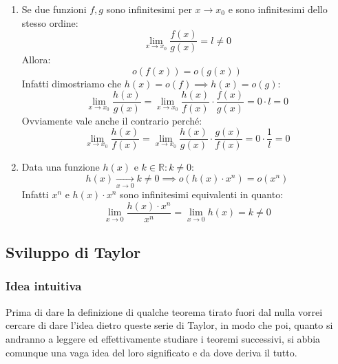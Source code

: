 \begin{enumerate}
	\item Se due funzioni $f,g$ sono infinitesimi per $x \to x_0$ e sono infinitesimi dello stesso ordine:
		\begin{equation*}
			\lim_{x \to x_0} \dfrac{f(x)}{g(x)} = l \neq 0
		\end{equation*}
		Allora:
		\begin{equation*}
			o(f(x)) = o(g(x))
		\end{equation*}
		Infatti dimostriamo che $h(x) = o(f) \implies h(x) = o(g)$:
		\begin{equation*}
			\lim_{x \to x_0} \dfrac{h(x)}{g(x)} = \lim_{x \to x_0} \dfrac{h(x)}{f(x)} \cdot \dfrac{f(x)}{g(x)} = 0 \cdot l = 0
		\end{equation*}
		Ovviamente vale anche il contrario perché:
		\begin{equation*}
			\lim_{x \to x_0} \dfrac{h(x)}{f(x)} = \lim_{x \to x_0} \dfrac{h(x)}{g(x)} \cdot \dfrac{g(x)}{f(x)} = 0 \cdot \dfrac{1}{l} = 0
		\end{equation*}

	\item Data una funzione $h(x)$ e $k \in \mathbb{R} : k \neq 0$:
		\begin{equation*}
			h(x) \xrightarrow[x \to 0]{} k \neq 0 \implies o(h(x) \cdot x^n) = o(x^n)
		\end{equation*}
		Infatti $x^n$ e $h(x) \cdot x^n$ sono infinitesimi equivalenti in quanto:
		\begin{equation*}
			\lim_{x \to 0} \dfrac{h(x) \cdot x^n}{x^n} = \lim_{x \to 0} h(x) = k \neq 0
		\end{equation*}
\end{enumerate}





\subsection{Sviluppo di Taylor}

\subsubsection{Idea intuitiva}
Prima di dare la definizione di qualche teorema tirato fuori dal nulla vorrei cercare di dare l'idea dietro queste serie di Taylor, in modo che poi, quanto si andranno a leggere ed effettivamente studiare i teoremi successivi, si abbia comunque una vaga idea del loro significato e da dove deriva il tutto.\\

